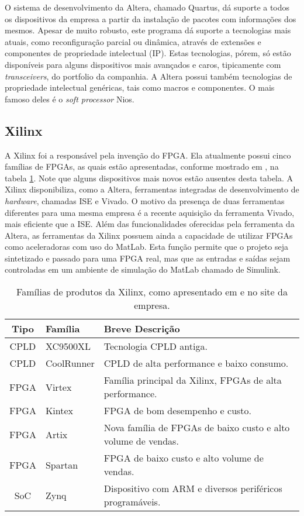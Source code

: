 \documentclass[11pt,a4paper,oneside]{book}
\begin{document}
O sistema de desenvolvimento da Altera, chamado Quartus, dá suporte a todos os dispositivos da empresa a partir da instalação de pacotes com informações dos mesmos.
Apesar de muito robusto, este programa dá suporte a tecnologias mais atuais, como reconfiguração parcial ou dinâmica, através de extensões e componentes de propriedade intelectual (IP).
Estas tecnologias, pórem, só estão disponíveis para alguns dispositivos mais avançados e caros, tipicamente com \textit{transceivers}, do portfolio da companhia.
A Altera possui também tecnologias de propriedade intelectual genéricas, tais como macros e componentes.
O mais famoso deles é o \textit{soft processor} Nios.

\subsection{Xilinx}
A Xilinx foi a respons\'avel pela inven\c{c}\~ao do FPGA.
Ela atualmente possui cinco fam\'i­lias de FPGAs, as quais est\~ao apresentadas, conforme mostrado em \cite{Woods2008}, na tabela \ref{tab:xilinx}.
Note que alguns dispositivos mais novos est\~ao ausentes desta tabela.
A Xilinx disponibiliza, como a Altera, ferramentas integradas de desenvolvimento de \textit{hardware}, chamadas ISE e Vivado.
O motivo da presen\c{c}a de duas ferramentas diferentes para uma mesma empresa \'e a recente aquisi\c{c}\~ao da ferramenta Vivado, mais eficiente que a ISE.
Al\'em das funcionalidades oferecidas pela ferramenta da Altera, as ferramentas da Xilinx possuem ainda a capacidade de utilizar FPGAs como aceleradoras com uso do MatLab.
Esta fun\c{c}\~ao permite que o projeto seja sintetizado e passado para uma FPGA real, mas que as entradas e sa\'i­das sejam controladas em um ambiente de simula\c{c}\~ao do MatLab chamado de Simulink.

\begin{table}[h]
\centering
\begin{tabular}{|c|l|p{6.5cm}|}
\hline
Tipo & Fam\'i­lia & Breve Descri\c{c}\~ao \\ \hline
CPLD & XC9500XL & Tecnologia CPLD antiga. \\ \hline
CPLD & CoolRunner & CPLD de alta performance e baixo consumo. \\ \hline
FPGA & Virtex & Fam\'i­lia principal da Xilinx, FPGAs de alta performance. \\ \hline
FPGA & Kintex & FPGA de bom desempenho e custo. \\ \hline
FPGA & Artix & Nova família de FPGAs de baixo custo e alto volume de vendas. \\ \hline
FPGA & Spartan & FPGA de baixo custo e alto volume de vendas. \\ \hline
SoC & Zynq & Dispositivo com ARM e diversos periféricos programáveis. \\ \hline
\end{tabular}
\caption{Fam\'i­lias de produtos da Xilinx, como apresentado em \cite{Woods2008} e no site da empresa.}
\label{tab:xilinx}
\end{table}
\end{document}
